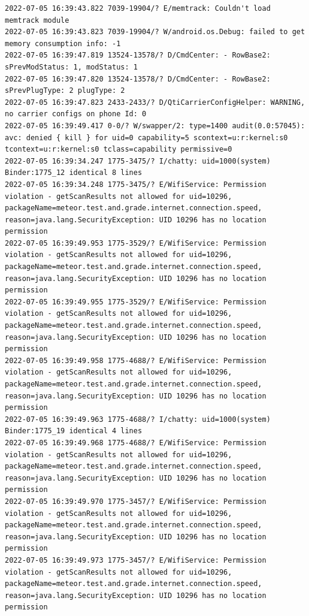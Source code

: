 \documentclass[a4paper,12pt]{book}
\begin{document}
\begin{lstlisting}
2022-07-05 16:39:43.822 7039-19904/? E/memtrack: Couldn't load memtrack module
2022-07-05 16:39:43.823 7039-19904/? W/android.os.Debug: failed to get memory consumption info: -1
2022-07-05 16:39:47.819 13524-13578/? D/CmdCenter: - RowBase2: sPrevModStatus: 1, modStatus: 1
2022-07-05 16:39:47.820 13524-13578/? D/CmdCenter: - RowBase2: sPrevPlugType: 2 plugType: 2
2022-07-05 16:39:47.823 2433-2433/? D/QtiCarrierConfigHelper: WARNING, no carrier configs on phone Id: 0
2022-07-05 16:39:49.417 0-0/? W/swapper/2: type=1400 audit(0.0:57045): avc: denied { kill } for uid=0 capability=5 scontext=u:r:kernel:s0 tcontext=u:r:kernel:s0 tclass=capability permissive=0
2022-07-05 16:39:34.247 1775-3475/? I/chatty: uid=1000(system) Binder:1775_12 identical 8 lines
2022-07-05 16:39:34.248 1775-3475/? E/WifiService: Permission violation - getScanResults not allowed for uid=10296, packageName=meteor.test.and.grade.internet.connection.speed, reason=java.lang.SecurityException: UID 10296 has no location permission
2022-07-05 16:39:49.953 1775-3529/? E/WifiService: Permission violation - getScanResults not allowed for uid=10296, packageName=meteor.test.and.grade.internet.connection.speed, reason=java.lang.SecurityException: UID 10296 has no location permission
2022-07-05 16:39:49.955 1775-3529/? E/WifiService: Permission violation - getScanResults not allowed for uid=10296, packageName=meteor.test.and.grade.internet.connection.speed, reason=java.lang.SecurityException: UID 10296 has no location permission
2022-07-05 16:39:49.958 1775-4688/? E/WifiService: Permission violation - getScanResults not allowed for uid=10296, packageName=meteor.test.and.grade.internet.connection.speed, reason=java.lang.SecurityException: UID 10296 has no location permission
2022-07-05 16:39:49.963 1775-4688/? I/chatty: uid=1000(system) Binder:1775_19 identical 4 lines
2022-07-05 16:39:49.968 1775-4688/? E/WifiService: Permission violation - getScanResults not allowed for uid=10296, packageName=meteor.test.and.grade.internet.connection.speed, reason=java.lang.SecurityException: UID 10296 has no location permission
2022-07-05 16:39:49.970 1775-3457/? E/WifiService: Permission violation - getScanResults not allowed for uid=10296, packageName=meteor.test.and.grade.internet.connection.speed, reason=java.lang.SecurityException: UID 10296 has no location permission
2022-07-05 16:39:49.973 1775-3457/? E/WifiService: Permission violation - getScanResults not allowed for uid=10296, packageName=meteor.test.and.grade.internet.connection.speed, reason=java.lang.SecurityException: UID 10296 has no location permission

\end{lstlisting}
\end{document}
